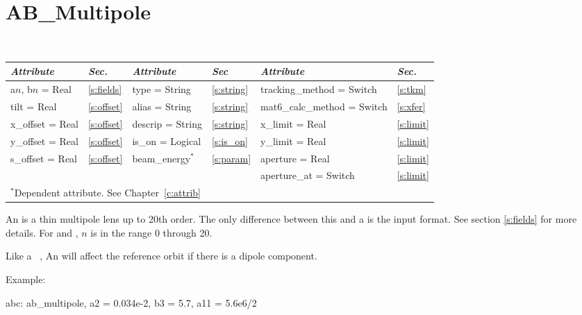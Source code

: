 \section{AB\_Multipole}
\label{s:ab_m}

\begin{center}
\tt 
\begin{tabular}{|l|l||l|l||l|l|} \hline
  {\sl Attribute} & {\sl Sec.}  & {\sl Attribute} & {\sl Sec} & {\sl Attribute} & {\sl Sec.} \\ \hline
  a$n$, b$n$ = Real  &  \ref{s:fields} &  type = String    & \ref{s:string} & tracking\_method = Switch    & \ref{s:tkm}   \\ \hline
  tilt       = Real  &  \ref{s:offset} &  alias = String   & \ref{s:string} & mat6\_calc\_method = Switch  & \ref{s:xfer}  \\ \hline
  x\_offset  = Real  &  \ref{s:offset} &  descrip = String & \ref{s:string} & x\_limit = Real              & \ref{s:limit} \\ \hline
  y\_offset  = Real  &  \ref{s:offset} &  is\_on = Logical & \ref{s:is_on}  & y\_limit = Real              & \ref{s:limit} \\ \hline
  s\_offset  = Real  &  \ref{s:offset} &  beam\_energy$^*$ & \ref{s:param}  & aperture = Real              & \ref{s:limit} \\ \hline
                     &                 &                   &                & aperture\_at = Switch        & \ref{s:limit} \\ \hline
  \multicolumn{6}{l}{\small $^*$Dependent attribute. See Chapter~\ref{c:attrib}} \\
\end{tabular}
\end{center}
\toffset

An  is a thin multipole lens up to 20th order. The only
difference between this and a  is the input format. See
section \ref{s:fields} for more details. For 
and , $n$ is in the range 0 through 20.

Like a \mad\ , An  will affect the
reference orbit if there is a dipole component. 

Example:
\begin{example}
  abc: ab_multipole, a2 = 0.034e-2, b3 = 5.7, a11 = 5.6e6/2
\end{example}

